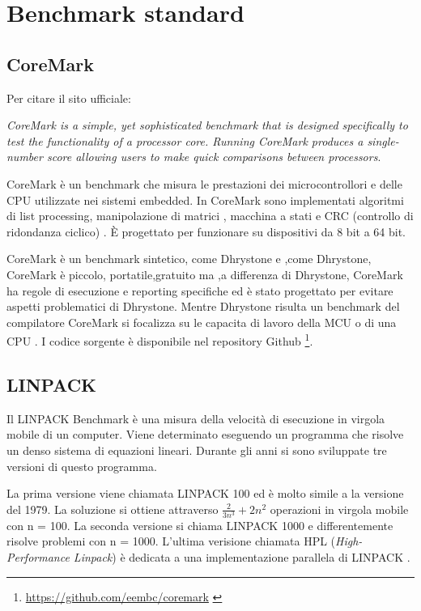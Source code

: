 \documentclass[12pt,a4paper]{report}
\begin{document}
\section{Benchmark standard}

\newpage
\subsection{CoreMark}
Per citare il sito ufficiale: 

\textit{CoreMark is a simple, yet sophisticated benchmark that is designed specifically to test the functionality of a processor core. Running CoreMark produces a single-number score allowing users to make quick comparisons between processors}. 

CoreMark è un benchmark che misura le prestazioni dei microcontrollori  e delle CPU utilizzate nei sistemi embedded. In CoreMark sono implementati algoritmi di list processing, manipolazione di matrici , macchina a stati  e CRC (controllo di ridondanza ciclico) . È progettato per funzionare su dispositivi da 8 bit a 64 bit\cite{CoreMark}.

CoreMark è un benchmark sintetico, come Dhrystone e ,come Dhrystone, CoreMark è piccolo, portatile,gratuito ma ,a differenza di Dhrystone, CoreMark ha regole di esecuzione e reporting specifiche ed è stato progettato per evitare aspetti problematici di Dhrystone. Mentre Dhrystone risulta un benchmark del compilatore CoreMark si focalizza su le capacita di lavoro della MCU o di una CPU \cite{analysis_EEMBC}.
I codice sorgente è disponibile nel repository Github \footnote{\url{https://github.com/eembc/coremark} \cite{RepoCoreMark}}.
		

\subsection{LINPACK}
Il LINPACK Benchmark è una misura della velocità di esecuzione in virgola mobile di un computer. Viene determinato eseguendo un programma  che risolve un denso sistema di equazioni lineari.  Durante gli anni si sono sviluppate tre versioni di questo programma. 

La prima versione viene chiamata LINPACK 100 ed è molto simile a la versione del 1979. La soluzione si ottiene attraverso $  \frac{2}{3n^3} + 2n^2 $ operazioni in virgola mobile con n = 100.   La seconda versione si chiama LINPACK 1000 e differentemente risolve problemi con n = 1000. L'ultima verisione chiamata HPL (\textit{High-Performance Linpack}) è dedicata a una implementazione parallela di LINPACK\cite{LINPACK_PastPresFut} \cite{hplNetLib}.
\end{document}
